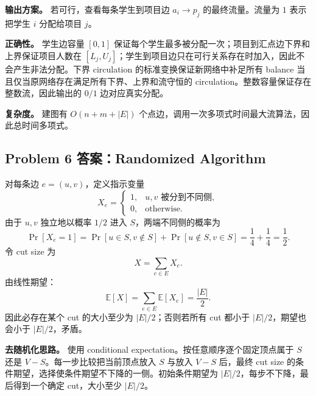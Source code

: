 \documentclass[UTF8,a4paper,11pt]{ctexart}
\begin{document}
\textbf{输出方案。} 若可行，查看每条学生到项目边 $a_i\to p_j$ 的最终流量。流量为 $1$ 表示把学生 $i$ 分配给项目 $j$。

\textbf{正确性。} 学生边容量 $[0,1]$ 保证每个学生最多被分配一次；项目到汇点边下界和上界保证项目人数在 $[L_j,U_j]$；学生到项目边只在可行关系存在时加入，因此不会产生非法分配。下界 circulation 的标准变换保证新网络中补足所有 balance 当且仅当原网络存在满足所有下界、上界和流守恒的 circulation。整数容量保证存在整数流，因此输出的 $0/1$ 边对应真实分配。

\textbf{复杂度。} 建图有 $O(n+m+|E|)$ 个点边，调用一次多项式时间最大流算法，因此总时间多项式。

\subsection*{Problem 6 答案：Randomized Algorithm}

对每条边 $e=(u,v)$，定义指示变量
\[
X_e=
\begin{cases}
1, & u,v\text{ 被分到不同侧},\\
0, & \text{otherwise}.
\end{cases}
\]
由于 $u,v$ 独立地以概率 $1/2$ 进入 $S$，两端不同侧的概率为
\[
\Pr[X_e=1]=\Pr[u\in S,v\notin S]+\Pr[u\notin S,v\in S]
=\frac14+\frac14=\frac12.
\]
令 cut size 为
\[
X=\sum_{e\in E}X_e.
\]
由线性期望：
\[
\mathbb E[X]=\sum_{e\in E}\mathbb E[X_e]=\frac{|E|}{2}.
\]
因此必存在某个 cut 的大小至少为 $|E|/2$；否则若所有 cut 都小于 $|E|/2$，期望也会小于 $|E|/2$，矛盾。

\textbf{去随机化思路。} 使用 conditional expectation。按任意顺序逐个固定顶点属于 $S$ 还是 $V-S$。每一步比较把当前顶点放入 $S$ 与放入 $V-S$ 后，最终 cut size 的条件期望，选择使条件期望不下降的一侧。初始条件期望为 $|E|/2$，每步不下降，最后得到一个确定 cut，大小至少 $|E|/2$。
\end{document}
